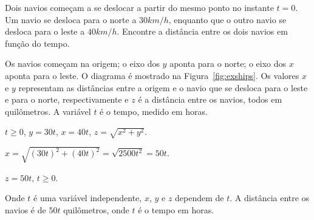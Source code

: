 \begin{example}
Dois navios começam a se deslocar a partir do mesmo ponto no instante
$t = 0$. Um navio se desloca para o norte a $30\si{km/h}$, enquanto que
o outro navio se desloca para o leste a $40\si{km/h}$. Encontre a
distância entre os dois navios em função do tempo.
\begin{stepanalysis}
\item Os navios começam na origem; o eixo dos $y$ aponta para o norte;
o eixo dos $x$ aponta para o leste. O diagrama é mostrado na
Figura~\ref{fig:exships}. Os valores $x$ e $y$ representam as distâncias
entre a origem e o navio que se desloca para o leste e para o norte,
respectivamente e $z$ é a distância entre os navios, todos em quilômetros.
A variável $t$ é o tempo, medido em horas.
\item $t \ge 0$, \hspace{1.5em} $y = 30t$, \hspace{1.5em} $x = 40t$,
      \hspace{1.5em} $z = \sqrt{x^2 + y^2}$.
\item $x = \sqrt{(30t)^2 + (40t)^2} = \sqrt{2500t^2} = 50t$.
\end{stepanalysis}
\begin{interpretsolution} $z = 50t$, \hspace{1.5em} $t \ge 0$.

Onde $t$ é uma variável independente, $x$, $y$ e $z$ dependem de $t$.
A distância entre os navios é de $50t$ quilômetros, onde $t$ é o
tempo em horas.
\end{interpretsolution}
\end{example}

